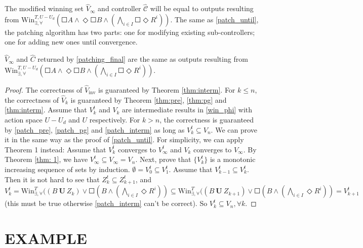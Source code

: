 The modified winning set $ \widehat{V}_{\infty} $ and controller $ \widehat{\mathcal{C}} $ will be equal to outputs resulting from $ \text{Win}_{\exists, \forall}^{T,U-U_d}\left(\Square A \wedge \Diamond \Square B \wedge \left( \bigwedge_{i\in I} \Square \Diamond R^i\right)\right) $. 
The same as \eqref{patch_until}, the patching algorithm has two parts: one for modifying existing sub-controllers; one for adding new ones until convergence.

\begin{theorem}
	$ \widehat{V}_\infty $ and $ \widehat{C} $ returned by \eqref{patching_final} are the same as outputs resulting from $\text{Win}_{\exists, \forall}^{T,U-U_d}\left(\Square A \wedge \Diamond \Square B \wedge \left( \bigwedge_{i\in I} \Square \Diamond R^i\right)\right) $. \label{thm:phi}
\end{theorem}



\begin{proof}

	The correctness of $ \widehat{V}_{\text{inv}} $ is guaranteed by Theorem \ref{thm:interm}.
	For $ k\leq n $, the correctness of $ \widehat{V}_{k} $ is guaranteed by Theorem \ref{thm:pre}, \ref{thm:pg} and \ref{thm:interm}. Assume that $ V^t_k $ and $ V_k $ are intermediate results in \eqref{win_phi} with action space $ U-U_d $ and $ U $ respectively. For $ k > n$, the correctness is guaranteed by  \eqref{patch_pre}, \eqref{patch_pg} and \eqref{patch_interm} as long as $ V^t_{k} \subseteq V_n $. We can prove it in the same way as the proof of \eqref{patch_until}. For simplicity, we can apply Theorem 1 instead:  Assume that $ V_k^t $ converges to $ V_{\infty}^t $ and $ V_k $ converges to $ V_{\infty} $. By Theorem \ref{thm: 1}, we have $ V^t_{\infty}\subseteq V_{\infty} = V_n $. Next, prove that $ \{V^t_k\} $ is a monotonic increasing sequence of sets by induction. $ \emptyset = V^t_0 \subseteq V^t_1 $. Assume that $ V^t_{k-1}\subseteq V^t_{k}$. Then it is not hard to see that $ Z^t_k \subseteq Z^t_{k+1} $, and $ V^t_k = \text{Win}_{\exists,\forall}^{T} ((B \mathbf{\ U\ }Z_{k}) \vee \Square (B\wedge ( \bigwedge_{i\in I}\Diamond R^i))\subseteq \text{Win}_{\exists,\forall}^{T} ((B \mathbf{\ U\ }Z_{k+1}) \vee \Square (B\wedge ( \bigwedge_{i\in I}\Diamond R^i))=V^t_{k+1} $ (this must be true otherwise \eqref{patch_interm} can't be correct). So $ V^t_k \subseteq V_n, \forall k $. 
	
\end{proof}


\section{EXAMPLE}
\label{sec:example}
